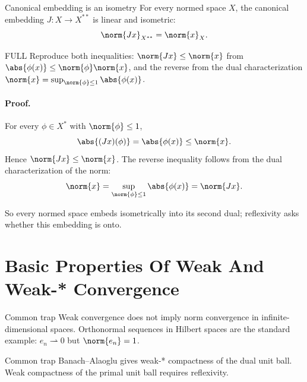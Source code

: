 \documentclass[header={Lecture 4 Exam Study Notes}]{study-note}
\begin{document}
\begin{thmbox}{Canonical embedding is an isometry}
For every normed space $X$, the canonical embedding $J:X\to X^{**}$ is linear and isometric:
\[
\norm{Jx}_{X^{**}}=\norm{x}_X.
\]
\end{thmbox}

\begin{prooflevelbox}{FULL}
Reproduce both inequalities: $\norm{Jx}\le\norm{x}$ from $\abs{\phi(x)}\le\norm{\phi}\norm{x}$, and the reverse from the dual characterization $\norm{x}=\sup_{\norm{\phi}\le 1}\abs{\phi(x)}$.
\end{prooflevelbox}

\paragraph{Proof.}
For every $\phi\in X^*$ with $\norm{\phi}\le 1$,
\[
\abs{(Jx)(\phi)}=\abs{\phi(x)}\le \norm{x}.
\]
Hence $\norm{Jx}\le \norm{x}$. The reverse inequality follows from the dual characterization of the norm:
\[
\norm{x}=\sup_{\norm{\phi}\le 1}\abs{\phi(x)}=\norm{Jx}.
\]

\begin{focusbox}
So every normed space embeds isometrically into its second dual; reflexivity asks whether this embedding is onto.
\end{focusbox}

\section{Basic Properties Of Weak And Weak-* Convergence}

\begin{warningbox}{Common trap}
Weak convergence does not imply norm convergence in infinite-dimensional spaces. Orthonormal sequences in Hilbert spaces are the standard example: $e_n\rightharpoonup0$ but $\norm{e_n}=1$.
\end{warningbox}

\begin{warningbox}{Common trap}
Banach--Alaoglu gives weak-* compactness of the dual unit ball. Weak compactness of the primal unit ball requires reflexivity.
\end{warningbox}
\end{document}
